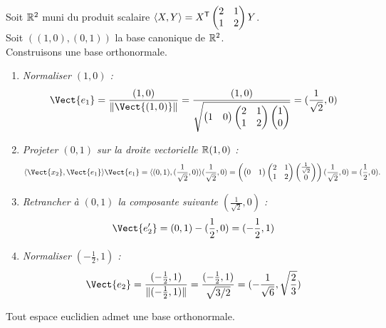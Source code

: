 \documentclass{book}
\begin{document}
\begin{Exemple}
Soit $\mathbb{R}^2$ muni du produit scalaire  $\langle X,Y\rangle=X^{\mathsf {T}}\begin{pmatrix}
2&1 \\1&2
\end{pmatrix}Y$.\\
Soit $((1,0),(0,1))$ la base canonique de $\mathbb{R}^2$.\\
Construisons une base orthonormale.
\begin{enumerate}
\item \textit{Normaliser $(1,0)$ : } $$\Vect{e_1}=\frac{(1,0)}{\norme{\Vect{(1,0)}}}=\frac{(1,0)}{\sqrt{\begin{pmatrix}
1 &0
\end{pmatrix}\begin{pmatrix}
2&1 \\1&2
\end{pmatrix}\begin{pmatrix}
1 \\0
\end{pmatrix}}}=(\frac{1}{\sqrt{2}},0)$$
\item \textit{Projeter $(0,1)$ sur la droite vectorielle  $\mathbb{R} (1,0)$ : }$$\PS{\Vect{x_2}}{\Vect{e_1}}\Vect{e_1}=\PS{(0,1)}{(\frac{1}{\sqrt{2}},0)}(\frac{1}{\sqrt{2}},0)=\left(\begin{pmatrix}
0 &1
\end{pmatrix}\begin{pmatrix}
2&1 \\1&2
\end{pmatrix}\begin{pmatrix}
\frac{1}{\sqrt{2}} \\0
\end{pmatrix}\right)(\frac{1}{\sqrt{2}},0) = (\frac{1}{2},0).  $$
\item \textit{Retrancher à $(0,1)$ la composante suivante $(\frac{1}{\sqrt{2}},0)$  : } $$\Vect{e'_2}= (0,1) - (\frac{1}{2},0)=(-\frac{1}{2},1)$$
\item \textit{Normaliser $(-\frac{1}{2},1)$ : } $$\Vect{e_2}=\frac{(-\frac{1}{2},1)}{\norme{(-\frac{1}{2},1)}}= \frac{(-\frac{1}{2},1)}{\sqrt{3/2}}=(-\frac{1}{\sqrt{6}},\sqrt{\frac 2 3})$$
\end{enumerate}

\end{Exemple}
\begin{Theoreme}
Tout espace euclidien admet une base orthonormale.
\end{Theoreme}
\end{document}
